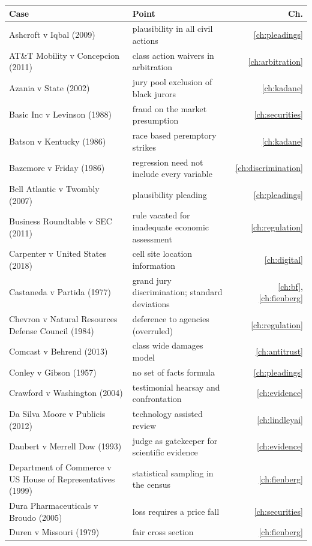\begin{longtable}{>{\raggedright\arraybackslash}p{3.7cm} >{\raggedright\arraybackslash}p{5.6cm} r}
\toprule
Case & Point & Ch.\\
\midrule
Ashcroft v Iqbal (2009) & plausibility in all civil actions & \ref{ch:pleadings}\\
AT\&T Mobility v Concepcion (2011) & class action waivers in arbitration & \ref{ch:arbitration}\\
Azania v State (2002) & jury pool exclusion of black jurors & \ref{ch:kadane}\\
Basic Inc v Levinson (1988) & fraud on the market presumption & \ref{ch:securities}\\
Batson v Kentucky (1986) & race based peremptory strikes & \ref{ch:kadane}\\
Bazemore v Friday (1986) & regression need not include every variable & \ref{ch:discrimination}\\
Bell Atlantic v Twombly (2007) & plausibility pleading & \ref{ch:pleadings}\\
Business Roundtable v SEC (2011) & rule vacated for inadequate economic assessment & \ref{ch:regulation}\\
Carpenter v United States (2018) & cell site location information & \ref{ch:digital}\\
Castaneda v Partida (1977) & grand jury discrimination; standard deviations & \ref{ch:bf}, \ref{ch:fienberg}\\
Chevron v Natural Resources Defense Council (1984) & deference to agencies (overruled) & \ref{ch:regulation}\\
Comcast v Behrend (2013) & class wide damages model & \ref{ch:antitrust}\\
Conley v Gibson (1957) & no set of facts formula & \ref{ch:pleadings}\\
Crawford v Washington (2004) & testimonial hearsay and confrontation & \ref{ch:evidence}\\
Da Silva Moore v Publicis (2012) & technology assisted review & \ref{ch:lindleyai}\\
Daubert v Merrell Dow (1993) & judge as gatekeeper for scientific evidence & \ref{ch:evidence}\\
Department of Commerce v US House of Representatives (1999) & statistical sampling in the census & \ref{ch:fienberg}\\
Dura Pharmaceuticals v Broudo (2005) & loss requires a price fall & \ref{ch:securities}\\
Duren v Missouri (1979) & fair cross section & \ref{ch:fienberg}\\

\end{longtable}
